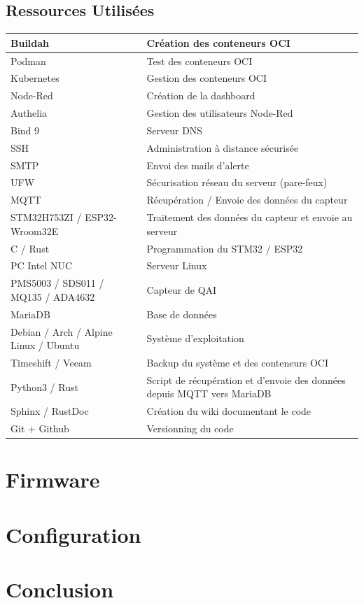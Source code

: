 \documentclass[a4paper,11pt]{article}
\begin{document}
    \subsection{Ressources Utilisées}
    \begin{tabular}{| C{5cm} | C{10cm} |}
        \hline
        Buildah & Création des conteneurs OCI \\
        \hline
        Podman  & Test des conteneurs OCI \\
        \hline
        Kubernetes  & Gestion des conteneurs OCI \\
        \hline
        Node-Red & Création de la dashboard \\
        \hline
        Authelia & Gestion des utilisateurs Node-Red \\
        \hline
        Bind 9 & Serveur DNS \\
        \hline
        SSH & Administration à distance sécurisée \\
        \hline
        SMTP & Envoi des mails d'alerte \\
        \hline
        UFW & Sécurisation réseau du serveur (pare-feux) \\
        \hline
        MQTT & Récupération / Envoie des données du capteur \\
        \hline
        STM32H753ZI / ESP32-Wroom32E & Traitement des données du capteur et envoie au serveur \\
        \hline
        C / Rust & Programmation du STM32 / ESP32 \\
        \hline
        PC Intel NUC & Serveur Linux \\
        \hline
        PMS5003 / SDS011 / MQ135 / ADA4632 & Capteur de QAI \\
        \hline
        MariaDB & Base de données \\
        \hline
        Debian / Arch / Alpine Linux / Ubuntu & Système d'exploitation \\
        \hline
        Timeshift / Veeam & Backup du système et des conteneurs OCI \\
        \hline
        Python3 / Rust & Script de récupération et d'envoie des données depuis MQTT vers MariaDB \\
        \hline
        Sphinx / RustDoc & Création du wiki documentant le code \\
        \hline
        Git + Github & Versionning du code \\
        \hline
    \end{tabular}
    \newpage
    \section{Firmware}
    \section{Configuration}
    \section{Conclusion}
    
\end{document}
